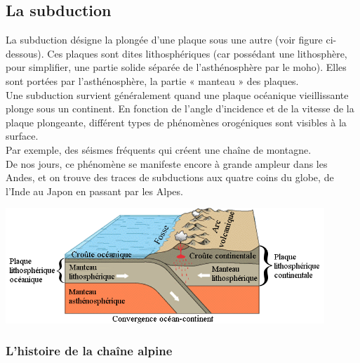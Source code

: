 \documentclass[a4paper,11pt]{article}
\begin{document}
\subsection{La subduction}

La subduction désigne la plongée d'une plaque sous une autre (voir figure ci-dessous). Ces plaques sont dites lithosphériques (car possédant une lithosphère, pour simplifier, une partie solide séparée de l'asthénosphère par le moho). Elles sont portées par l'asthénosphère, la partie « manteau » des plaques.\\
Une subduction survient généralement quand une plaque océanique vieillissante plonge sous un continent. 
En fonction de l'angle d'incidence et de la vitesse de la plaque plongeante, différent types de phénomènes orogéniques sont visibles à la surface. \\
Par exemple, des séismes fréquents qui créent une chaîne de montagne.\\
De nos jours, ce phénomène se manifeste encore à grande ampleur dans les Andes, et on trouve des traces de subductions aux quatre coins du globe, de l'Inde au Japon en passant par les Alpes. \\

\begin{center}
  \includegraphics[width=12cm]{Images/subduction_2.png}
\end{center}

\subsubsection{L'histoire de la chaîne alpine}
\end{document}
